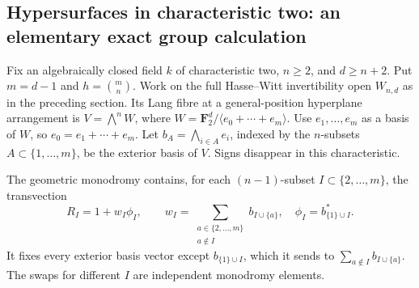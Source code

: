 \subsection{Hypersurfaces in characteristic two: an elementary exact group calculation}
\label{subsec:pn-char2-exact}

Fix an algebraically closed field $k$ of characteristic two,
$n\geq2$, and $d\geq n+2$.  Put $m=d-1$ and
$h=\binom{m}{n}$.  Work on the full Hasse--Witt invertibility
open $W_{n,d}$ as in the preceding section.  Its Lang fibre
at a general-position hyperplane arrangement is
$V=\bigwedge^n W$, where
$W=\mathbf F_2^d/\langle e_0+\cdots+e_m\rangle$.
Use $e_1,\ldots,e_m$ as a basis of $W$, so
$e_0=e_1+\cdots+e_m$.
Let $b_A=\bigwedge_{i\in A}e_i$, indexed by the $n$-subsets
$A\subset\{1,\ldots,m\}$, be the exterior basis of $V$.
Signs disappear in this characteristic.

\begin{lemma}\label{lem:char2-independent-quadric-swaps}
The geometric monodromy contains, for each
$(n-1)$-subset $I\subset\{2,\ldots,m\}$, the transvection
\begin{equation}\label{eq:char2-quadric-transvection}
 R_I=1+w_I\phi_I,\qquad
 w_I=\sum_{\substack{a\in\{2,\ldots,m\}\\a\notin I}}b_{I\cup\{a\}},
 \quad
 \phi_I=b_{\{1\}\cup I}^*.
\end{equation}
It fixes every exterior basis vector except
$b_{\{1\}\cup I}$, which it sends to
$\sum_{a\notin I}b_{I\cup\{a\}}$.
The swaps for different $I$ are independent monodromy elements.
\end{lemma}

